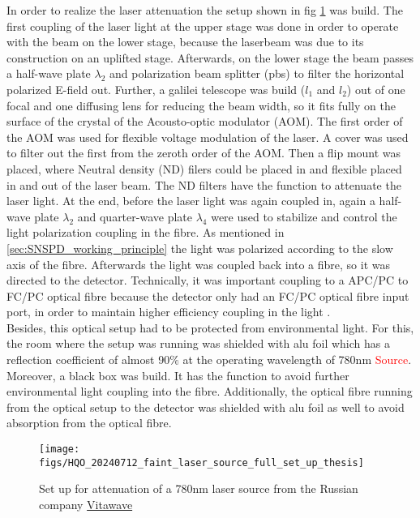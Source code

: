 In order to realize the laser attenuation the setup shown in fig \ref{fig: faint_laser_source_full_set_up} was build.
The first coupling of the laser light at the upper stage was done in order to operate with the beam on the lower stage, because the laserbeam
was due to its construction on an uplifted stage. 
Afterwards, on the lower stage the beam passes a half-wave plate $\lambda_2$ and polarization beam splitter (pbs) to filter the horizontal
polarized E-field out.
Further, a galilei telescope was build ($l_1$ and $l_2$) out of one focal and one diffusing lens for reducing the beam width, so it fits fully
on the surface of the crystal of the Acousto-optic modulator (AOM).
The first order of the AOM was used for flexible voltage modulation of the laser.
A cover was used to filter out the first from the zeroth order of the AOM.
Then a flip mount was placed, where Neutral density (ND) filers could be placed in and flexible placed in and out of the laser beam.
The ND filters have the function to attenuate the laser light. 
At the end, before the laser light was again coupled in, again a half-wave plate $\lambda_2$ and quarter-wave plate $\lambda_4$ were used to
stabilize and control the light polarization coupling in the fibre.
As mentioned in \ref{sec:SNSPD_working_principle} the light was polarized according to the slow axis of the fibre.
Afterwards the light was coupled back into a fibre, so it was directed to the detector.
Technically, it was important coupling to a APC/PC to FC/PC optical fibre because the detector only had
an FC/PC optical fibre input port, in order to maintain higher efficiency coupling in the light \cite{single-quantum-2022}.\\

Besides, this optical setup had to be protected from environmental light.
For this, the room where the setup was running was shielded
with alu foil which has a reflection coefficient of almost 90$\%$ at the operating wavelength of 780nm \textcolor{red}{Source}.
Moreover, a black box was build.
It has the function to avoid further environmental light coupling into the fibre.
Additionally, the optical fibre running from the optical setup to the detector was shielded with alu foil as well to
avoid absorption from the optical fibre. \\

\begin{figure}
    \centering
    \texttt{[image: figs/HQO\_20240712\_faint\_laser\_source\_full\_set\_up\_thesis]}
    \caption{Set up for attenuation of a 780nm laser source from the Russian company \href{http://vitawave.ru/eng/}{Vitawave}}
    \label{fig: faint_laser_source_full_set_up}
\end{figure}


